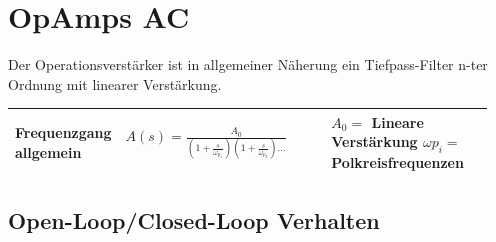 \section{OpAmps AC}

Der Operationsverstärker ist in allgemeiner Näherung ein Tiefpass-Filter n-ter Ordnung mit linearer Verstärkung.

 \begin{tabular}{|p{0.15\linewidth}|p{0.45\linewidth}|p{0.35\linewidth}|}
 	\hline
 	Frequenzgang allgemein
 		& \large{$A(s) = \frac{A_{0}}{(1+\frac{s}{\omega_{p_1}})(1+\frac{s}{\omega_{p_2}})\dots}$}
 		& $A_{0}=$ Lineare Verstärkung \newline $\omega{p_i}=$ Polkreisfrequenzen \\
 	\hline
 \end{tabular}
 
\subsection{Open-Loop/Closed-Loop Verhalten}

